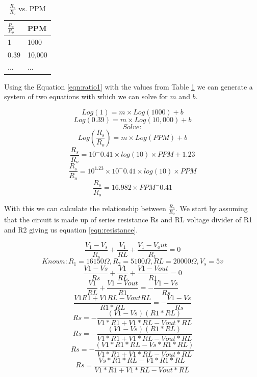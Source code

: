 				\begin{table}[h]
					\centering
					\begin{tabular}{ll}
						$\frac{R_s}{R_o}$ & PPM \\
						\hline
						1 & 1000 \\
						0.39 & 10,000 \\ 
						... & ... 
					\end{tabular}
				\caption{$\frac{R_s}{R_o}$ vs. PPM}
				\label{tab:ppmEx}
				\end{table}
				\par Using the Equation \ref{eqn:ratio1} with the values from Table \ref{tab:ppmEx} we can generate a system of two equations with which we can solve for $m$ and $b$. \\
				\begin{center}
					\small

						\[Log(1) = m \times Log(1000) + b  \]
						\[Log(0.39) = m \times Log(10,000) + b \]
						\[Solve:  \]
						\[Log(\frac{R_s}{R_o}) = m \times Log(PPM) + b \]
						\[\frac{R_s}{R_o} = 10^-0.41\times log(10) \times PPM + 1.23\]
						\[\frac{R_s}{R_o} = 10^1.23 \times 10^-0.41 \times log(10) \times PPM \]
						\[\frac{R_s}{R_o} = 16.982 \times PPM^-0.41 \]

				\end{center}
				\par With this we can calculate the relationship between $\frac{R_s}{R_o}$. We start by assuming  that the circuit is made up of series resistance Rs and RL voltage divider of R1 and R2 giving us equation \ref{eqn:resistance}. 
				\begin{center}
					\small
					\begin{equation}
					\frac{V_1-V_s}{R_s}+\frac{V_1}{RL}+\frac{V_1-V_out}{R_1}=0
					\label{eqn:resistance}
					\end{equation}
					\[Known: R_1 = 16150\Omega, R_2 = 5100\Omega, RL = 20000\Omega, V_s = 5 v\]	
					\[\frac{V1-Vs}{Rs}+\frac{V1}{RL}+\frac{V1-Vout}{R1}=0\] 					
					\[\frac{V1}{RL}+\frac{V1-Vout}{R1}=-\frac{V1-Vs}{Rs}\] 					
					\[\frac{V1R1+V1RL-VoutRL}{R1*RL}=-\frac{V1-Vs}{Rs}\] 					
					\[Rs=-\frac{\left(V1-Vs\right)\left(R1*RL\right)}{V1*R1+V1*RL-Vout*RL}\] 					
					\[Rs=-\frac{\left(V1-Vs\right)\left(R1*RL\right)}{V1*R1+V1*RL-Vout*RL}\] 					
					\[Rs=-\frac{\left(V1*R1*RL-Vs*R1*RL\right)}{V1*R1+V1*RL-Vout*RL}\] 
					\begin{equation}
					Rs=\frac{Vs*R1*RL-V1*R1*RL}{V1*R1+V1*RL-Vout*RL}
					\label{eqn:resRatio}
					\end{equation}
				\end{center}
